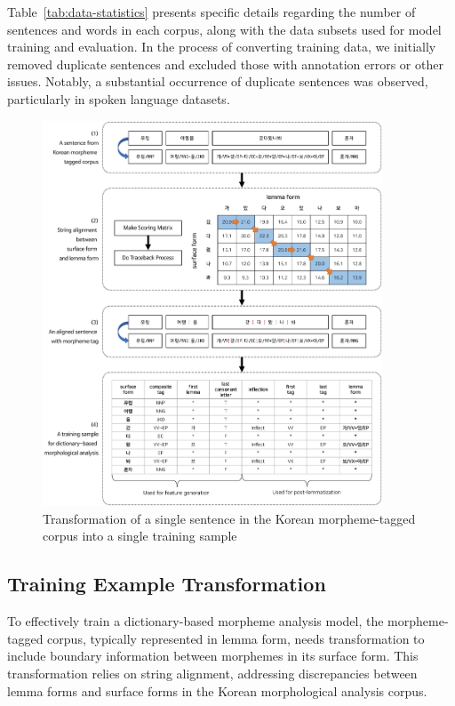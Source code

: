 \documentclass[AMS,STIX2COL]{WileyNJD-v2}
\begin{document}
    Table~\ref{tab:data-statistics} presents specific details regarding the number of sentences and words in each corpus, along with the data subsets used for model training and evaluation.
    In the process of converting training data, we initially removed duplicate sentences and excluded those with annotation errors or other issues.
    Notably, a substantial occurrence of duplicate sentences was observed, particularly in spoken language datasets.

    \begin{figure}[ht]
        \centerline{\includegraphics[width=0.9\textwidth]{fig;sample-v3}}
        \caption{Transformation of a single sentence in the Korean morpheme-tagged corpus into a single training sample}
        \label{fig:sample}
    \end{figure}

    \subsection{Training Example Transformation}\label{subsec:training-example-transformation}

    To effectively train a dictionary-based morpheme analysis model, the morpheme-tagged corpus, typically represented in lemma form, needs transformation to include boundary information between morphemes in its surface form.
    This transformation relies on string alignment, addressing discrepancies between lemma forms and surface forms in the Korean morphological analysis corpus.
\end{document}
